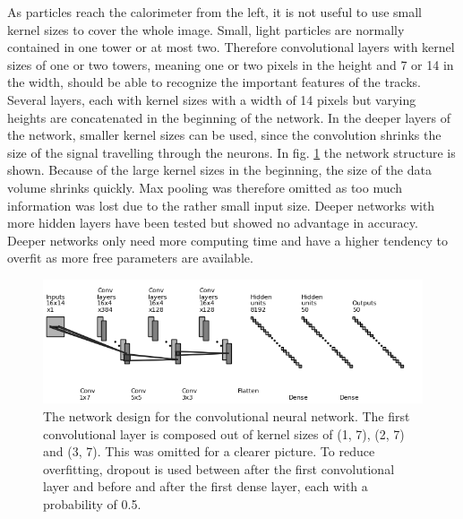 As particles reach the calorimeter from the left, it is not useful to use small kernel sizes to cover the whole image. Small, light particles are normally contained in one tower or at most two. Therefore convolutional layers with kernel sizes of one or two towers, meaning one or two pixels in the height and 7 or 14 in the width, should be able to recognize the important features of the tracks. Several layers, each with kernel sizes with a width of 14 pixels but varying heights are concatenated in the beginning of the network. In the deeper layers of the network, smaller kernel sizes can be used, since the convolution shrinks the size of the signal travelling through the neurons. In fig. \ref{convnet} the network structure is shown. Because of the large kernel sizes in the beginning, the size of the data volume shrinks quickly. Max pooling was therefore omitted as too much information was lost due to the rather small input size. Deeper networks with more hidden layers have been tested but showed no advantage in accuracy. Deeper networks only need more computing time and have a higher tendency to overfit as more free parameters are available. 

\begin{figure}
\includegraphics[scale=0.85]{convnet_fig.png}
\caption{The network design for the convolutional neural network. The first convolutional layer is composed out of kernel sizes of (1, 7), (2, 7) and (3, 7). This was omitted for a clearer picture. To reduce overfitting, dropout is used between after the first convolutional layer and before and after the first dense layer, each with a probability of 0.5. \protect \footnotemark}
\label{convnet}
\end{figure}

